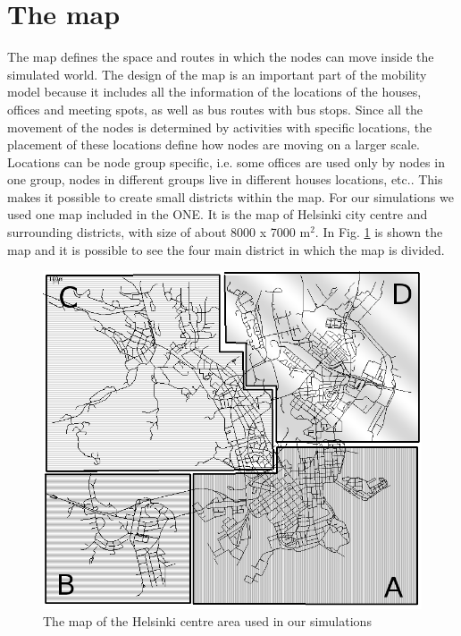 \section{The map}
\label{mappaONE}
The map defines the space and routes in which the nodes can move inside the simulated world. The design of the map is an important part of the mobility model because it includes all the information of the locations of the houses, offices and meeting spots, as well as bus routes with bus stops. Since all the movement of the nodes is determined by activities with specific locations, the placement of these locations define how nodes are moving on a larger scale. Locations can be node group specific, i.e. some offices are used only by nodes in one group, nodes in different groups live in different houses locations, etc.. This makes it possible to create small districts within the map. For our simulations we used one map included in the ONE. It is the map of Helsinki city centre and surrounding districts, with size of about 8000 x 7000 m$^{2}$. In Fig. \ref{imgMappaABCD} is shown the map and it is possible to see the four main district in which the map is divided. 

\begin{figure}[htpb]
  \begin{center}
    \includegraphics[scale=0.5]{figure/mappa_ABCD.png}
    \caption[Helsinky map]{The map of the Helsinki centre area used in our simulations}    
    \label{imgMappaABCD}
  \end{center}
\end{figure}


